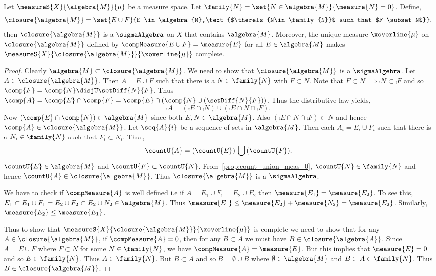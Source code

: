 \begin{Theorem}[name=Completion of a measure]\label{thm:comp_of_meas}
    Let $\measureS{X}{\algebra{M}}{\mu}$ be a measure space. Let $\family{N} = \set{N \in
	\algebra{M}}{\measure{N} = 0}$. Define,
    \[\closure{\algebra{M}} = \set{E\cup F}{E \in \algebra{M},\text{$\thereIs{N\in\family{N}}$ such
	    that $F \subset N$}},\]
     then $\closure{\algebra{M}}$ is a $\sigmaAlgebra$ on $X$ that contains $\algebra{M}$. Moreover,
     the unique measure $\xoverline{\mu}$ on $\closure{\algebra{M}}$ defined by 
     $\compMeasure{E\cup F} = \measure{E}$ for all $E \in \algebra{M}$ makes
     $\measureS{X}{\closure{\algebra{M}}}{\xoverline{\mu}}$ complete.
\end{Theorem}
\begin{proof}
    Clearly $\algebra{M} \subset \closure{\algebra{M}}$. We need to show that
    $\closure{\algebra{M}}$ is a $\sigmaAlgebra$. Let $A \in \closure{\algebra{M}}$. Then $A = E
    \cup F$ such that there is a $N \in \family{N}$ with $F \subset N$. Note that $F \subset N
    \implies \comp{N} \subset \comp{F}$ and so $\comp{F} = \comp{N} \disjU \setDiff{N}{F}$. 
    Thus $\comp{A} = \comp{E}\cap\comp{F} = \comp{E}\cap(\comp{N}\cup(\setDiff{N}{F}))$. 
    Thus the distributive law yields,
    \[\comp{A} = (\comp{E}\cap\comp{N})\cup (\comp{E}\cap{N}\cap\comp{F}).\]
    Now $(\comp{E}\cap\comp{N}) \in \algebra{M}$ since both $E,N \in \algebra{M}$.
    Also $(\comp{E}\cap{N}\cap\comp{F}) \subset N$ and hence $\comp{A} \in \closure{\algebra{M}}$.
    Let $\seq{A}{i}$ be a sequence of sets in $\algebra{M}$. Then each $A_i = E_i \cup F_i$ such
    that there is a $N_i \in \family{N}$ such that $F_i \subset N_i$. Thus,
    \[\countU{A} = (\countU{E})\, \bigcup\, (\countU{F}).\]
    $\countU{E} \in \algebra{M}$ and $\countU{F} \subset \countU{N}$.
    From~\ref{prop:count_union_meas_0}, $\countU{N} \in \family{N}$ and hence $\countU{A} \in
    \closure{\algebra{M}}$. Thus $\closure{\algebra{M}}$ is a $\sigmaAlgebra$.

    We have to check if $\compMeasure{A}$ is well defined i.e if $A = E_1 \cup F_1 = E_2 \cup F_2$
    then $\measure{E_1} = \measure{E_2}$. To see this, $E_1 \subset E_1 \cup F_1 = E_2 \cup F_2
    \subset E_2 \cup N_2 \in \algebra{M}$. Thus $\measure{E_1} \leq \measure{E_2} + \measure{N_2} =
    \measure{E_2}$. Similarly, $\measure{E_2}  \leq \measure{E_1}$. 
    
    Thus to show that 
    $\measureS{X}{\closure{\algebra{M}}}{\xoverline{\mu}}$ is complete we need to show that for any
    $A \in \closure{\algebra{M}}$, if $\compMeasure{A} = 0$, then for any $B \subset A$ we must have
    $B \in \closure{\algebra{A}}$. Since $A = E \cup F$ where $F \subset N$ for some $N \in
    \family{N}$, we have $\compMeasure{A} = \measure{E}$. But this implies that $\measure{E} = 0$
    and so $E \in \family{N}$. Thus $A \in \family{N}$. But $B \subset A$ and so $B = \emptyset
    \cup B$ where $\emptyset \in \algebra{M}$ and $B \subset A \in \family{N}$. Thus $B \in
    \closure{\algebra{M}}$. 
\end{proof}
